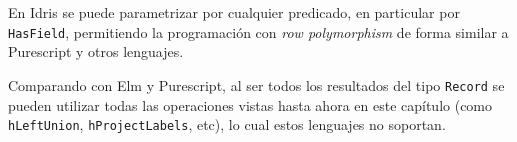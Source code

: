 En Idris se puede parametrizar por cualquier predicado, en particular por \texttt{HasField}, permitiendo la programación con \textit{row polymorphism} de forma similar a Purescript y otros lenguajes.

Comparando con Elm y Purescript, al ser todos los resultados del tipo \texttt{Record} se pueden utilizar todas las operaciones vistas hasta ahora en este capítulo (como \texttt{hLeftUnion}, \texttt{hProjectLabels}, etc), lo cual estos lenguajes no soportan.



